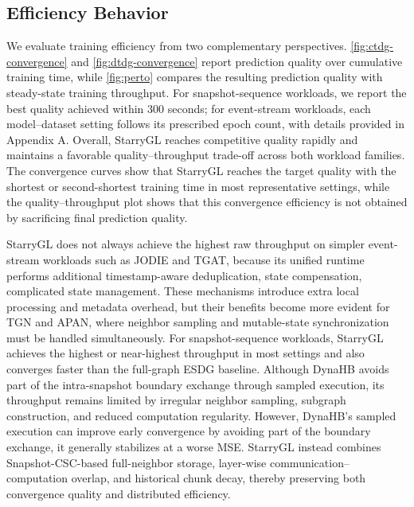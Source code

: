 \subsection{Efficiency Behavior}
\label{sec:efficiency}
We evaluate training efficiency from two complementary perspectives.
\autoref{fig:ctdg-convergence} and
\autoref{fig:dtdg-convergence} report prediction quality over
cumulative training time, while
\autoref{fig:perto} compares the resulting prediction
quality with steady-state training throughput. For snapshot-sequence
workloads, we report the best quality achieved within 300 seconds;
for event-stream workloads, each model--dataset setting follows its
prescribed epoch count, with details provided in
Appendix A.
Overall, StarryGL reaches competitive quality rapidly and
maintains a favorable quality--throughput trade-off across both
workload families. The convergence curves show that StarryGL reaches
the target quality with the shortest or second-shortest training time
in most representative settings, while the quality--throughput plot
shows that this convergence efficiency is not obtained by sacrificing
final prediction quality.

StarryGL does not always achieve the highest raw throughput on simpler
event-stream workloads such as JODIE and TGAT, because its unified
runtime performs additional timestamp-aware deduplication, state
compensation, complicated state management.
These mechanisms introduce extra local processing and metadata
overhead, but their benefits become more evident for TGN and APAN,
where neighbor sampling and mutable-state synchronization must be
handled simultaneously. For snapshot-sequence workloads, StarryGL
achieves the highest or near-highest throughput in most settings and
also converges faster than the full-graph ESDG baseline. Although DynaHB avoids part of the
intra-snapshot boundary exchange through sampled execution, its
throughput remains limited by irregular neighbor sampling, subgraph
construction, and reduced computation regularity. 
However, DynaHB's sampled execution can improve early convergence by avoiding
part of the boundary exchange, it generally stabilizes at a worse
MSE. StarryGL instead combines Snapshot-CSC-based full-neighbor
storage, layer-wise communication--computation overlap, and historical
chunk decay, thereby preserving both convergence quality and
distributed efficiency.

